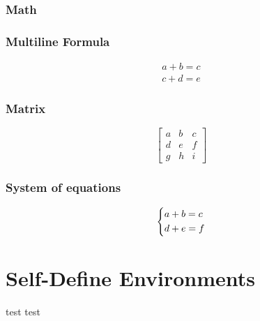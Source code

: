 \subsubsection{Math}

\subsubsection{Multiline Formula}
\begin{gather*}
	a + b = c \\
	c + d = e
\end{gather*}

\subsubsection{Matrix}
\[
	\begin{bmatrix}
		a & b & c \\
		d & e & f \\
		g & h & i
	\end{bmatrix}
\]

\subsubsection{System of equations}
\[
	\begin{dcases}
		a + b = c \\
		d + e = f
	\end{dcases}
\]

\section{Self-Define Environments}

\begin{Def}{test}{}
  test
\end{Def}

